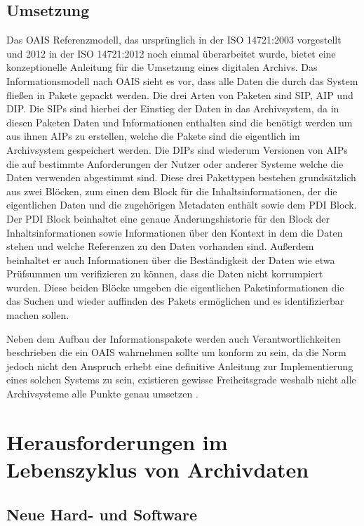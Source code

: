\documentclass[conference,compsoc,final,a4paper]{IEEEtran}
\begin{document}
\subsection{Umsetzung}
Das \ac{OAIS} Referenzmodell, das ursprünglich in der ISO 14721:2003 vorgestellt und 2012 in der ISO 14721:2012 noch einmal überarbeitet wurde, bietet eine konzeptionelle Anleitung für die Umsetzung eines digitalen Archivs. Das Informationsmodell nach \ac{OAIS} sieht es vor, dass alle Daten die durch das System fließen in Pakete gepackt werden. Die drei Arten von Paketen sind \ac{SIP}, \ac{AIP} und \ac{DIP}. Die \ac{SIP}s sind hierbei der Einstieg der Daten in das Archivsystem, da in diesen Paketen Daten und Informationen enthalten sind die benötigt werden um aus ihnen \ac{AIP}s zu erstellen, welche die Pakete sind die eigentlich im Archivsystem gespeichert werden. Die \ac{DIP}s sind wiederum Versionen von \ac{AIP}s die auf bestimmte Anforderungen der Nutzer oder anderer Systeme welche die Daten verwenden abgestimmt sind. Diese drei Pakettypen bestehen grundsätzlich aus zwei Blöcken, zum einen dem Block für die Inhaltsinformationen, der die eigentlichen Daten und die zugehörigen Metadaten enthält sowie dem \ac{PDI} Block. Der \ac{PDI} Block beinhaltet eine genaue Änderungshistorie für den Block der Inhaltsinformationen sowie Informationen über den Kontext in dem die Daten stehen und welche Referenzen zu den Daten vorhanden sind. Außerdem beinhaltet er auch Informationen über die Beständigkeit der Daten wie etwa Prüfsummen um verifizieren zu können, dass die Daten nicht korrumpiert wurden. Diese beiden Blöcke umgeben die eigentlichen Paketinformationen die das Suchen und wieder auffinden des Pakets ermöglichen und es identifizierbar machen sollen.

Neben dem Aufbau der Informationspakete werden auch Verantwortlichkeiten beschrieben die ein \ac{OAIS} wahrnehmen sollte um konform zu sein, da die Norm jedoch nicht den Anspruch erhebt eine definitive Anleitung zur Implementierung eines solchen Systems zu sein, existieren gewisse Freiheitsgrade weshalb nicht alle Archivsysteme alle Punkte genau umsetzen \autocite{Ball2006}.

\section{Herausforderungen im Lebenszyklus von Archivdaten}


\subsection{Neue Hard- und Software}
\end{document}
